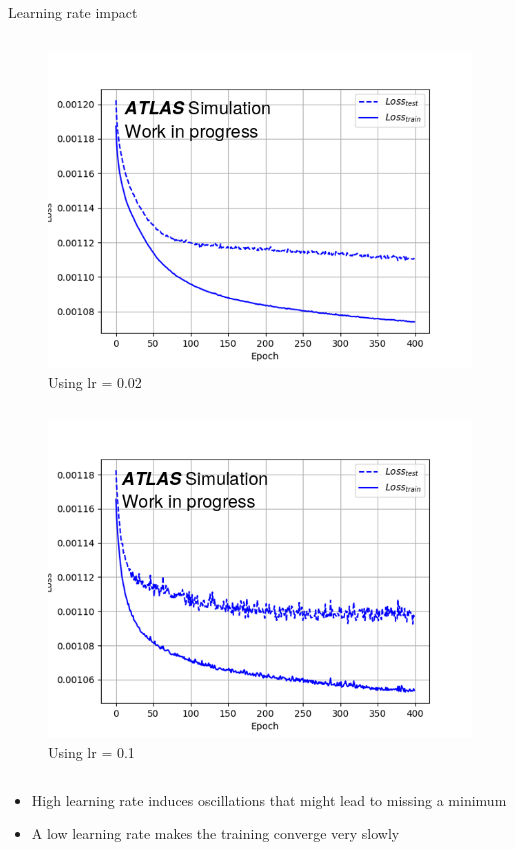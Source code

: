 \documentclass[12pt]{beamer}
\begin{document}
\begin{frame}{Learning rate impact}
\vspace{-1.1cm}
    \begin{column}{0.5\textwidth}
    \begin{figure}
        \centering
        \includegraphics[width=1.1\textwidth]{lr002.png}
        \caption{Using lr = 0.02}
        \label{fig:my_label}
    \end{figure}
\end{column}
\begin{column}{0.5\textwidth}
    \begin{figure}
        \centering
        \includegraphics[width=1.1\textwidth]{lr01.png}
        \caption{Using lr = 0.1}
        \label{fig:my_label}
    \end{figure}
\end{column}
\begin{itemize}
    \item High learning rate induces oscillations that might lead to missing a minimum
    \item A low learning rate makes the training converge very slowly
\end{itemize}
\end{frame}
\end{document}
